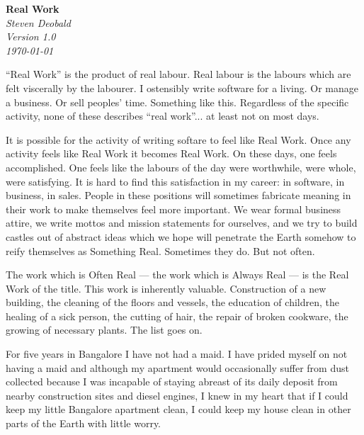 \documentclass{article}
\begin{document}
\begin{titlepage}
   \begin{center}
     \Huge\textbf{Real Work}\\
     \vspace{5cm}
     \large\textit{Steven Deobald}\\
     \large\textit{Version 1.0}\\
     \large\textit\today
   \end{center}
\end{titlepage}

``Real Work'' is the product of real labour. Real labour is the labours which are felt viscerally by the labourer. I ostensibly write software for a living. Or manage a business. Or sell peoples' time. Something like this. Regardless of the specific activity, none of these describes ``real work''... at least not on most days.

It is possible for the activity of writing softare to feel like Real Work. Once any activity feels like Real Work it becomes Real Work. On these days, one feels accomplished. One feels like the labours of the day were worthwhile, were whole, were satisfying. It is hard to find this satisfaction in my career: in software, in business, in sales. People in these positions will sometimes fabricate meaning in their work to make themselves feel more important. We wear formal business attire, we write mottos and mission statements for ourselves, and we try to build castles out of abstract ideas which we hope will penetrate the Earth somehow to reify themselves as Something Real. Sometimes they do. But not often.

The work which is Often Real --- the work which is Always Real --- is the Real Work of the title. This work is inherently valuable. Construction of a new building, the cleaning of the floors and vessels, the education of children, the healing of a sick person, the cutting of hair, the repair of broken cookware, the growing of necessary plants. The list goes on.

For five years in Bangalore I have not had a maid. I have prided myself on not having a maid and although my apartment would occasionally suffer from dust collected because I was incapable of staying abreast of its daily deposit from nearby construction sites and diesel engines, I knew in my heart that if I could keep my little Bangalore apartment clean, I could keep my house clean in other parts of the Earth with little worry.
\end{document}
